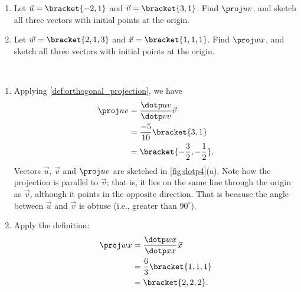 \begin{example}\label{ex_dotp4}
\begin{enumerate}
	\item Let $\vec u=\bracket{-2,1}$ and $\vec v=\bracket{3,1}$. Find $\proj uv$, and sketch all three vectors with initial points at the origin.
	\item	Let $\vec w =\bracket{2,1,3}$ and $\vec x =\bracket{1,1,1}$. Find $\proj wx$, and sketch all three vectors with initial points at the origin.
\end{enumerate}
\solution
\mbox{}\\[-\baselineskip]\begin{enumerate}
	\item Applying \autoref{def:orthogonal_projection}, we have
	\begin{align*}
		\proj uv
		&= \frac{\dotp uv}{\dotp vv}\vec v \\
		&= \frac{-5}{10}\bracket{3,1}\\
		&=\bracket{-\frac32,-\frac12}.
	\end{align*}
	Vectors $\vec u$, $\vec v$ and $\proj uv$ are sketched in \autoref{fig:dotp4}(a). Note how the projection is parallel to $\vec v$; that is, it lies on the same line through the origin as $\vec v$, although it points in the opposite direction. That is because the angle between $\vec u$ and $\vec v$ is obtuse (i.e., greater than $90^\circ$).
	
	\item	Apply the definition:
	\begin{align*}
		\proj wx
		&= \frac{\dotp wx}{\dotp xx}\vec x \\
		&= \frac{6}{3}\bracket{1,1,1}\\
		&=\bracket{2,2,2}.
	\end{align*}
\end{enumerate}
\end{example}


